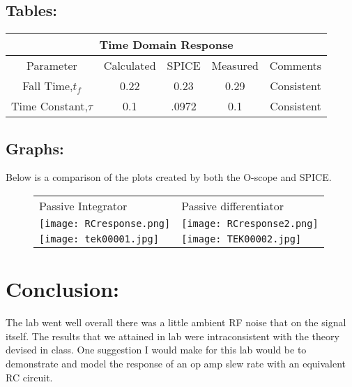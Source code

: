 \documentclass[10pt,a4paper]{article}
\begin{document}
\subsection{Tables:}

\begin{center}
\begin{tabular}{|c||c|c|c|c|}
\hline 
\multicolumn{5}{|c|}{\textbf{Time Domain Response} } \\ 
\hline 
Parameter & Calculated  & SPICE & Measured  & Comments \\ 
\hline 
Fall Time,$t_{f}$ & 0.22 & 0.23 & 0.29 &  Consistent \\ 
\hline 
Time Constant,$\tau$ & 0.1 & .0972 & 0.1 & Consistent   \\ 
\hline 
\end{tabular} 
\end{center}


\subsection{Graphs:}
Below is a comparison of the plots created by both the O-scope and SPICE. 
\begin{figure}
\begin{tabular}{l l}

Passive Integrator & Passive differentiator \\
\texttt{[image: RCresponse.png]} & \texttt{[image: RCresponse2.png]}\\ 
\texttt{[image: tek00001.jpg]}& \texttt{[image: TEK00002.jpg]} \\
\end{tabular} 
\end{figure}



\section*{Conclusion:}
The lab went well overall there was a little ambient RF noise that on the signal itself. The results that we attained in lab were intraconsistent with the theory devised in class. One suggestion I would make for this lab would be to demonstrate and model the response of an op amp slew rate with an equivalent RC circuit. 
\end{document}
